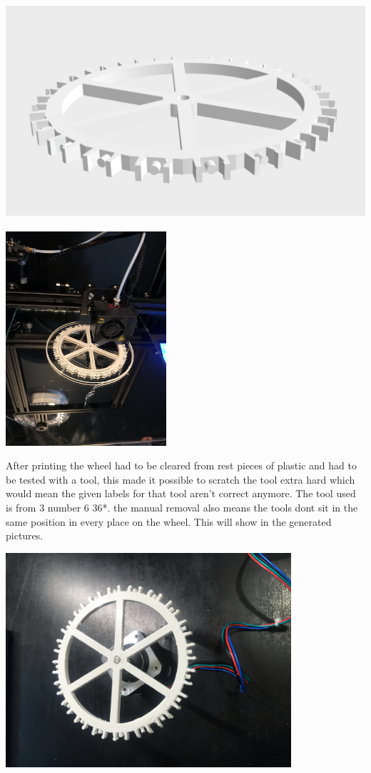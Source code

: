 \includegraphics[height=3.125000in, keepaspectratio=true]{./fig/Camera_setup/Tool_Holder/Wheel_Holder/first_wheel_holder/radhouder.png}



\includegraphics[height=3.125000in, keepaspectratio=true]{./fig/Camera_setup/Tool_Holder/Wheel_Holder/first_wheel_holder/radhouder_duringprint.jpeg}

After printing the wheel had to be cleared from rest pieces of plastic and had to be tested with a tool, this made it possible to scratch the tool extra hard which would mean the given labels for that tool aren't correct anymore. The tool used is from 3 number 6 36*. the manual removal also means the tools dont sit in the same position in every place on the wheel. This will show in the generated pictures.

\includegraphics[height=3.125000in, keepaspectratio=true]{./fig/Camera_setup/Tool_Holder/Wheel_Holder/first_wheel_holder/radhouder_horizontal.jpeg}



